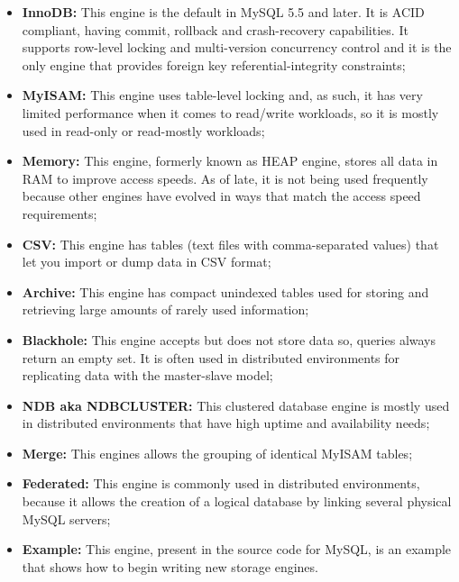 \documentclass[12pt]{article}
\begin{document}
\begin{itemize}
    \item \textbf{InnoDB:} This engine is the default in MySQL 5.5 and later. It is ACID compliant, having commit, rollback and crash-recovery capabilities. It supports row-level locking and multi-version concurrency control and it is the only engine that provides foreign key referential-integrity constraints;
    
    \item \textbf{MyISAM:} This engine uses table-level locking and, as such, it has very limited performance when it comes to read/write workloads, so it is mostly used in read-only or read-mostly workloads;
    
    \item \textbf{Memory:} This engine, formerly known as HEAP engine, stores all data in RAM to improve access speeds. As of late, it is not being used frequently because other engines have evolved in ways that match the access speed requirements; 
    
    \item \textbf{CSV:} This engine has tables (text files with comma-separated values) that let you import or dump data in CSV format;
    
    \item \textbf{Archive:} This engine has compact unindexed tables used for storing and retrieving large amounts of rarely used information;
    
    \item \textbf{Blackhole:} This engine accepts but does not store data so, queries always return an empty set. It is often used in distributed environments for replicating data with the master-slave model;

    \item \textbf{NDB aka NDBCLUSTER:} This clustered database engine is mostly used in distributed environments that have high uptime and availability needs;
    
    \item \textbf{Merge:} This engines allows the grouping of identical MyISAM tables;
    
    \item \textbf{Federated:} This engine is commonly used in distributed environments, because it allows the creation of a logical database by linking several physical MySQL servers;
    
    \item \textbf{Example:} This engine, present in the source code for MySQL, is an example that shows how to begin writing new storage engines.
    
\end{itemize}
\end{document}
